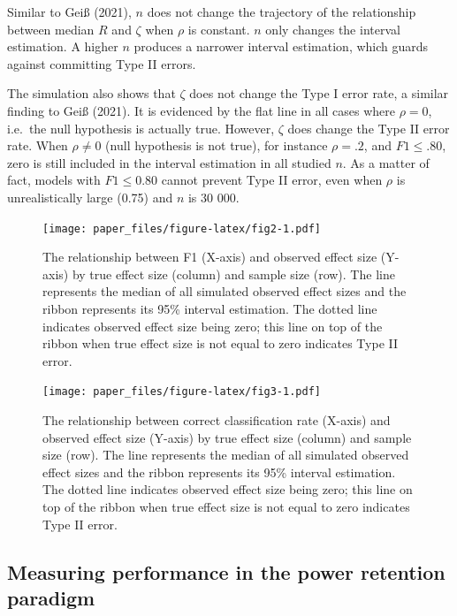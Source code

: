 \documentclass[english,man,floatsintext]{apa6}
\begin{document}
Similar to Geiß (2021), \(n\) does not change the trajectory of the relationship between median \(R\) and \(\zeta\) when \(\rho\) is constant. \(n\) only changes the interval estimation. A higher \(n\) produces a narrower interval estimation, which guards against committing Type II errors.

The simulation also shows that \(\zeta\) does not change the Type I error rate, a similar finding to Geiß (2021). It is evidenced by the flat line in all cases where \(\rho = 0\), i.e.~the null hypothesis is actually true. However, \(\zeta\) does change the Type II error rate. When \(\rho \neq 0\) (null hypothesis is not true), for instance \(\rho = .2\), and \(F1 \le .80\), zero is still included in the interval estimation in all studied \(n\). As a matter of fact, models with \(F1 \le 0.80\) cannot prevent Type II error, even when \(\rho\) is unrealistically large (0.75) and \(n\) is 30 000.

\begin{figure}
\centering
\texttt{[image: paper\_files/figure-latex/fig2-1.pdf]}
\caption{\label{fig:fig2}The relationship between F1 (X-axis) and observed effect size (Y-axis) by true effect size (column) and sample size (row). The line represents the median of all simulated observed effect sizes and the ribbon represents its 95\% interval estimation. The dotted line indicates observed effect size being zero; this line on top of the ribbon when true effect size is not equal to zero indicates Type II error.}
\end{figure}

\begin{figure}
\centering
\texttt{[image: paper\_files/figure-latex/fig3-1.pdf]}
\caption{\label{fig:fig3}The relationship between correct classification rate (X-axis) and observed effect size (Y-axis) by true effect size (column) and sample size (row). The line represents the median of all simulated observed effect sizes and the ribbon represents its 95\% interval estimation. The dotted line indicates observed effect size being zero; this line on top of the ribbon when true effect size is not equal to zero indicates Type II error.}
\end{figure}

\hypertarget{measuring-performance-in-the-power-retention-paradigm}{%
\subsection{Measuring performance in the power retention paradigm}\label{measuring-performance-in-the-power-retention-paradigm}}
\end{document}
